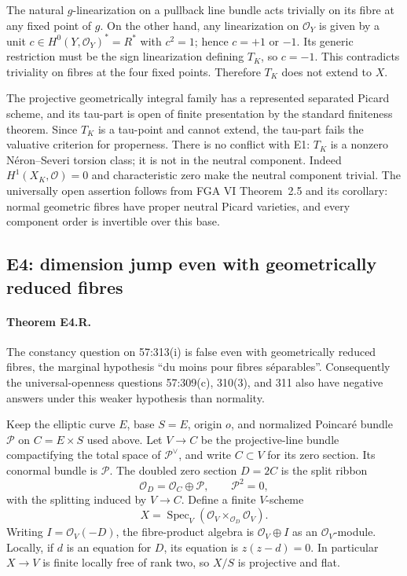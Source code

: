 The natural $g$-linearization on a pullback line bundle acts trivially on
its fibre at any fixed point of $g$. On the other hand, any linearization
on $\mathcal O_Y$ is given by a unit $c\in H^0(Y,\mathcal O_Y)^*=R^*$ with
$c^2=1$; hence $c=+1$ or $-1$. Its generic restriction must be the sign
linearization defining $T_K$, so $c=-1$. This contradicts triviality on
fibres at the four fixed points. Therefore $T_K$ does not extend to $X$.

The projective geometrically integral family has a represented separated
Picard scheme, and its tau-part is open of finite presentation by the
standard finiteness theorem. Since $T_K$ is a tau-point and cannot extend,
the tau-part fails the valuative criterion for properness. There is no
conflict with E1: $T_K$ is a nonzero N\'eron--Severi torsion class; it is not
in the neutral component. Indeed $H^1(X_K,\mathcal O)=0$ and characteristic
zero make the neutral component trivial. The universally open assertion
follows from FGA VI Theorem~2.5 and its corollary: normal geometric fibres
have proper neutral Picard varieties, and every component order is
invertible over this base.

\subsection{E4: dimension jump even with geometrically reduced fibres}

\paragraph{Theorem E4.R.}
The constancy question on 57:313(i) is false even with geometrically reduced
fibres, the marginal hypothesis ``du moins pour fibres s\'eparables''.
Consequently the universal-openness questions 57:309(c), 310(3), and 311
also have negative answers under this weaker hypothesis than normality.

Keep the elliptic curve $E$, base $S=E$, origin $o$, and normalized
Poincar\'e bundle $\mathcal P$ on $C=E\times S$ used above. Let $V\to C$ be
the projective-line bundle compactifying the total space of
$\mathcal P^\vee$, and write $C\subset V$ for its zero section. Its conormal
bundle is $\mathcal P$. The doubled zero section $D=2C$ is the split ribbon
\[
 \mathcal O_D=\mathcal O_C\oplus\mathcal P,\qquad\mathcal P^2=0,
\]
with the splitting induced by $V\to C$. Define a finite $V$-scheme
\[
 X=\operatorname{Spec}_V\!\left(
 \mathcal O_V\times_{\mathcal O_D}\mathcal O_V\right).       \tag{E4.R.1}
\]
Writing $I=\mathcal O_V(-D)$, the fibre-product algebra is
$\mathcal O_V\oplus I$ as an $\mathcal O_V$-module. Locally, if $d$ is an
equation for $D$, its equation is $z(z-d)=0$. In particular $X\to V$ is
finite locally free of rank two, so $X/S$ is projective and flat.

